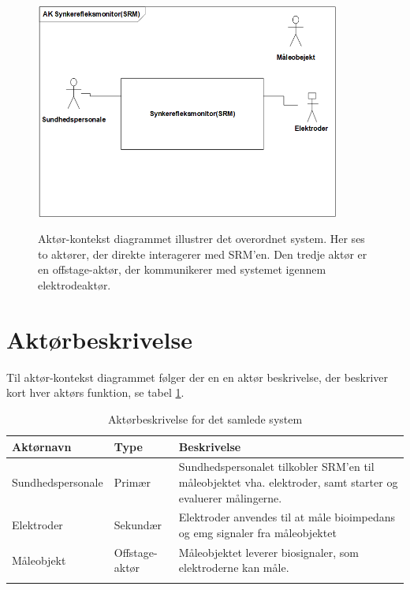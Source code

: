 \begin{figure}[H]
\centering
{\includegraphics[width=10cm]
{Figure/AktoerKontextDiagram}}
\caption{Aktør-kontekst diagrammet illustrer det overordnet system. Her ses to aktører, der direkte interagerer med SRM'en. Den tredje aktør er en offstage-aktør, der kommunikerer med systemet igennem elektrodeaktør.      }
\label{fig:sysbeskrivelse}
\end{figure}  

 

\section{Aktørbeskrivelse}
Til aktør-kontekst diagrammet følger der en en aktør beskrivelse, der beskriver kort hver aktørs funktion, se tabel \ref{tab:aktoerbeskrivelse}.    
\begin{table}[H]
\begin{tabularx}{\textwidth}{l l X}
     Aktørnavn	&	Type		&	Beskrivelse \\ \midrule
     Sundhedspersonale   	&  	Primær  	& 	Sundhedspersonalet tilkobler SRM'en til måleobjektet vha. elektroder, samt starter og evaluerer målingerne.     \\ 			  \addlinespace[2mm]
     Elektroder	&	Sekundær	& Elektroder anvendes til at måle bioimpedans og emg signaler fra måleobjektet  	 \\   \addlinespace[2mm]

Måleobjekt	&	Offstage-aktør	& Måleobjektet   leverer biosignaler, som elektroderne kan måle.   	 \\   \addlinespace[2mm]
     
   
     \bottomrule                                                                                                                   
    \end{tabularx}
    \caption {Aktørbeskrivelse for det samlede system}
    \label{tab:aktoerbeskrivelse}
	
\end{table}

